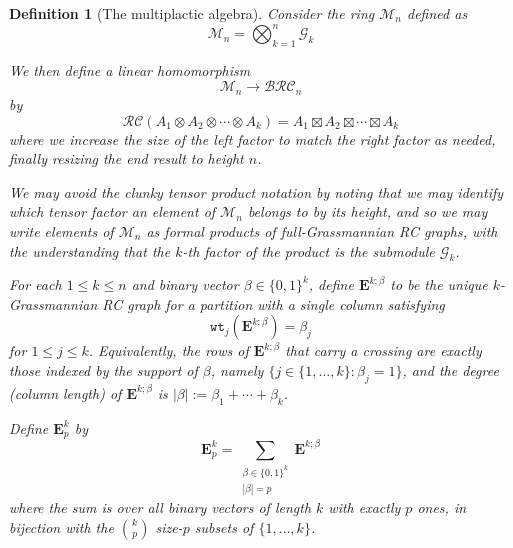 \documentclass[pdflatex,sn-mathphys-num]{sn-jnl}
\numberwithin{equation}{subsection}
\newcommand{\wtt}{\mathtt{wt}}
\newcommand{\grass}{\mathcal{G}}
\newcommand{\BRC}{\mathcal{BRC}}
\newcommand{\RC}{\mathcal{RC}}
\theoremstyle{thmstyleone}
\theoremstyle{thmstylethree}
\newtheorem{definition}[lemma]{Definition}
\theoremstyle{thmstyletwo}
\begin{document}
\begin{definition}[The multiplactic algebra]
Consider the ring $\mathcal{M}_n$ defined as
$$\mathcal{M}_n = \bigotimes_{k=1}^n \grass_k$$

We then define a linear homomorphism
$$\mathcal{M}_n\to \BRC_n$$
by
$$\RC(A_1\otimes A_2\otimes \cdots \otimes A_k) = A_1\boxtimes A_2\boxtimes \cdots \boxtimes A_k$$
where we increase the size of the left factor to match the right factor as needed, finally resizing the end result to height $n$.

We may avoid the clunky tensor product notation by noting that we may identify which tensor factor an element of $\mathcal{M}_n$ belongs to by its height, and so we may write elements of $\mathcal{M}_n$ as formal products of full-Grassmannian RC graphs, with the understanding that the $k$-th factor of the product is the submodule $\grass_k$.

For each $1\leq k\leq n$ and binary vector $\beta\in\{0,1\}^k$, define $\mathbf{E}^{k;\beta}$ to be the unique $k$-Grassmannian RC graph for a partition with a single column satisfying
$$\wtt_j(\mathbf{E}^{k;\beta}) = \beta_j$$
for $1\leq j\leq k$. Equivalently, the rows of $\mathbf{E}^{k;\beta}$ that carry a crossing are exactly those indexed by the support of $\beta$, namely $\{j\in\{1,\ldots,k\}:\beta_j=1\}$, and the degree (column length) of $\mathbf{E}^{k;\beta}$ is $|\beta|:=\beta_1+\cdots+\beta_k$.

Define $\mathbf{E}_{p}^k$ by
$$\mathbf{E}_{p}^k = \sum_{\substack{\beta\in\{0,1\}^k\\ |\beta|=p}} \mathbf{E}^{k;\beta}$$
where the sum is over all binary vectors of length $k$ with exactly $p$ ones, in bijection with the $\binom{k}{p}$ size-$p$ subsets of $\{1,\ldots,k\}$.
\end{definition}
\end{document}
